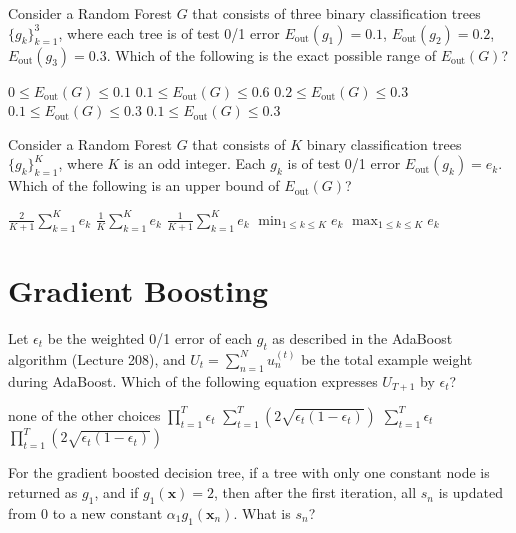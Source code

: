 \documentclass[a4paper,10pt]{exam}
\begin{document}
\begin{questions}
	\question Consider a Random Forest $G$ that consists of three binary classification trees $\{g_k\}_{k=1}^3$, where each tree is of test 0/1 error $E_{\text{out}}(g_1) = 0.1$, $E_{\text{out}}(g_2) = 0.2$, $E_{\text{out}}(g_3) = 0.3$. Which of the following is the exact possible range of $E_{\text{out}}(G)$?
	\begin{checkboxes}
		\choice $0 \le E_{\text{out}}(G) \le 0.1$
		\choice $0.1 \le E_{\text{out}}(G) \le 0.6$
		\choice $0.2 \le E_{\text{out}}(G) \le 0.3$
		\choice $0.1 \le E_{\text{out}}(G) \le 0.3$
		\CorrectChoice $0.1 \le E_{\text{out}}(G) \le 0.3$\\
	\end{checkboxes}

	\question Consider a Random Forest $G$ that consists of $K$ binary classification trees $\{g_k\}_{k=1}^K$, where $K$ is an odd integer. Each $g_k$ is of test 0/1 error $E_{\text{out}}(g_k) = e_k$. Which of the following is an upper bound of $E_{\text{out}}(G)$?
	\begin{checkboxes}
		\CorrectChoice $\frac{2}{K+1} \sum_{k=1}^K e_k$
		\choice $\frac{1}{K} \sum_{k=1}^K e_k$
		\choice $\frac{1}{K+1} \sum_{k=1}^K e_k$
		\choice $\min_{1 \le k \le K} e_k$
		\choice $\max_{1 \le k \le K} e_k$\\
	\end{checkboxes}

	\section*{Gradient Boosting}
	\question
	Let $\epsilon_t$ be the weighted 0/1 error of each $g_t$ as described in the AdaBoost algorithm (Lecture 208), and $U_t = \sum_{n=1}^N u_n^{(t)}$ be the total example weight during AdaBoost. Which of the following equation expresses $U_{T+1}$ by $\epsilon_t$?
	\begin{checkboxes}
		\choice none of the other choices
		\choice $\prod_{t=1}^T \epsilon_t$
		\choice $\sum_{t=1}^T (2 \sqrt{\epsilon_t(1-\epsilon_t)})$
		\choice $\sum_{t=1}^T \epsilon_t$
		\CorrectChoice $\prod_{t=1}^T (2 \sqrt{\epsilon_t(1-\epsilon_t)})$\\
	\end{checkboxes}

	\question For the gradient boosted decision tree, if a tree with only one constant node is returned as $g_1$, and if $g_1(\mathbf{x}) = 2$, then after the first iteration, all $s_n$ is updated from $0$ to a new constant $\alpha_1 g_1(\mathbf{x}_n)$. What is $s_n$?


\end{questions}
\end{document}
